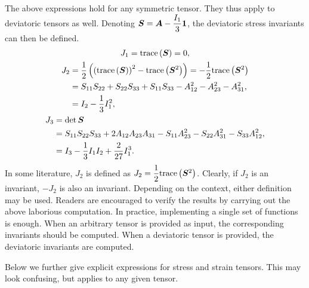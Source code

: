 The above expressions hold for any symmetric tensor.
They thus apply to deviatoric tensors as well.
Denoting $\bm{S}=\bm{A}-\dfrac{I_1}{3}\bm{1}$, the deviatoric stress invariants can then be defined.
\begin{gather}
J_1=\text{trace}\left(\bm{S}\right)=0,\\
\begin{split}
J_2&=\dfrac{1}{2}\left(\left(\text{trace}\left(\bm{S}\right)\right)^2-\text{trace}\left(\bm{S}^2\right)\right)=-\dfrac{1}{2}\text{trace}\left(\bm{S}^2\right)\\
&=S_{11}S_{22}+S_{22}S_{33}+S_{11}S_{33}-A_{12}^2-A_{23}^2-A_{31}^2,\\
&=I_2-\dfrac{1}{3}I_1^2,
\end{split}\\
\begin{split}
J_3&=\det{\bm{S}}\\
&=S_{11}S_{22}S_{33}+2A_{12}A_{23}A_{31}-S_{11}A_{23}^2-S_{22}A_{31}^2-S_{33}A_{12}^2,\\
&=I_3-\dfrac{1}{3}I_1I_2+\dfrac{2}{27}I_1^3.
\end{split}
\end{gather}
In some literature, $J_2$ is defined as $J_2=\dfrac{1}{2}\text{trace}\left(\bm{S}^2\right)$.
Clearly, if $J_2$ is an invariant, $-J_2$ is also an invariant.
Depending on the context, either definition may be used.
Readers are encouraged to verify the results by carrying out the above laborious computation.
In practice, implementing a single set of functions is enough.
When an arbitrary tensor is provided as input, the corresponding invariants should be computed.
When a deviatoric tensor is provided, the deviatoric invariants are computed.

Below we further give explicit expressions for stress and strain tensors.
This may look confusing, but  applies to any given tensor.
